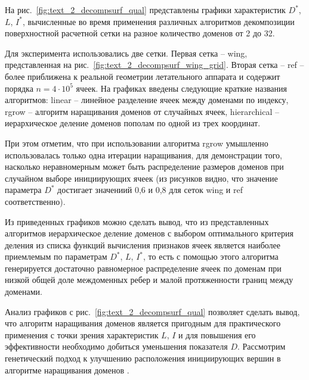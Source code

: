 На рис.~\ref{fig:text_2_decompsurf_qual} представлены графики характеристик $D^{*}$, $L$, $I^{*}$, вычисленные во время применения различных алгоритмов декомпозиции поверхностной расчетной сетки на разное количество доменов от 2 до 32.

Для эксперимента использовались две сетки.
Первая сетка -- wing, представленная на рис.~\ref{fig:text_2_decompsurf_wing_grid}.
Вторая сетка -- ref -- более приближена к реальной геометрии летательного аппарата и содержит порядка $n = 4 \cdot 10^5$ ячеек.
На графиках введены следующие краткие названия алгоритмов: linear -- линейное разделение ячеек между доменами по индексу, rgrow -- алгоритм наращивания доменов от случайных ячеек, hierarchical -- иерархическое деление доменов пополам по одной из трех координат.

При этом отметим, что при использовании алгоритма rgrow умышленно использовалась только одна итерации наращивания, для демонстрации того, насколько неравномерным может быть распределение размеров доменов при случайном выборе инициирующих ячеек (из рисунков видно, что значение параметра $D^{*}$ достигает значениий 0,6 и 0,8 для сеток wing и ref соответственно).

Из приведенных графиков можно сделать вывод, что из представленных алгоритмов иерархическое деление доменов с выбором оптимального критерия деления из списка функций вычисления признаков ячеек является наиболее приемлемым по параметрам $D^{*}$, $L$, $I^{*}$, то есть с помощью этого алгоритма генерируется достаточно равномерное распределение ячеек по доменам при низкой общей доле междоменных ребер и малой протяженности границ между доменами.


Анализ графиков с рис.~\ref{fig:text_2_decompsurf_qual} позволяет сделать вывод, что алгоритм наращивания доменов является пригодным для практического применения с точки зрения характеристик $L$, $I$ и для повышения его эффективности необходимо добиться уменьшения показателя $D$.
Рассмотрим генетический подход к улучшению расположения инициирующих вершин в алгоритме наращивания доменов \cite{Rybakov2025GenDecomp}.

